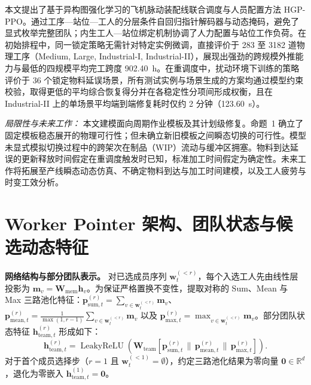 \documentclass[journal,10pt]{IEEEtran}
\begin{document}
本文提出了基于异构图强化学习的飞机脉动装配线联合调度与人员配置方法 HGP-PPO。通过工序---站位---工人的分层条件自回归指针解码器与动态掩码，避免了显式枚举完整团队；内生工人---站位绑定机制协调了人力配置与站位工作负荷。在初始排程中，同一锁定策略无需针对特定实例微调，直接评价于 283 至 3182 道物理工序（Medium, Large, Industrial-I, Industrial-II），展现出强劲的跨规模外推能力与最低的四规模平均完工跨度 902.40~h。在重调度中，扰动环境下训练的策略评价于 36 个锁定物料延误场景，所有测试实例与场景生成的方案均通过模型约束校验，取得更低的平均综合恢复得分并在各稳定性分项间形成权衡，且在 Industrial-II 上的单场景平均端到端修复耗时仅约 2 分钟（123.60~s）。

\textit{局限性与未来工作：}
本文建模面向周期作业模板及其计划级修复。命题~1 确立了固定模板稳态展开的物理可行性；但未确立新旧模板之间瞬态切换的可行性。模型未显式模拟切换过程中的跨架次在制品（WIP）流动与缓冲区拥塞。物料到达延误的更新释放时间假定在重调度触发时已知，标准加工时间假定为确定性。未来工作将拓展至产线瞬态动态仿真、不确定物料到达与加工时间建模，以及工人疲劳与时变工效分析。

\appendices

\section{Worker Pointer 架构、团队状态与候选动态特征}\label{app:worker_pointer}

\textbf{网络结构与部分团队表示。} 对已选成员序列 $\mathbf w_t^{(<r)}$，每个入选工人先由线性层投影为 $\mathbf m_v = \mathbf W_{\mathrm{mem}}\mathbf h_v$。为保证严格置换不变性，提取对称的 Sum、Mean 与 Max 三路池化特征：$\mathbf p_{\mathrm{sum},t}^{(r)} = \sum_{v\in \mathbf w_t^{(<r)}} \mathbf m_v$、$\mathbf p_{\mathrm{mean},t}^{(r)} = \frac{1}{\max(1, r-1)}\sum_{v\in \mathbf w_t^{(<r)}} \mathbf m_v$ 以及 $\mathbf p_{\mathrm{max},t}^{(r)} = \max_{v\in \mathbf w_t^{(<r)}} \mathbf m_v$。部分团队状态特征 $\mathbf h_{\mathrm{team},t}^{(r)}$ 形成如下：
\begin{equation}
\mathbf h_{\mathrm{team},t}^{(r)} = \operatorname{LeakyReLU}\left( \mathbf W_{\mathrm{team}} \left[ \mathbf p_{\mathrm{sum},t}^{(r)} \,\|\, \mathbf p_{\mathrm{mean},t}^{(r)} \,\|\, \mathbf p_{\mathrm{max},t}^{(r)} \right] \right).
\end{equation}
对于首个成员选择步（$r=1$ 且 $\mathbf w_t^{(<1)}=\emptyset$），约定三路池化结果为零向量 $\mathbf 0\in\mathbb R^d$，退化为零嵌入 $\mathbf h_{\mathrm{team},t}^{(1)}=\mathbf 0$。
\end{document}
